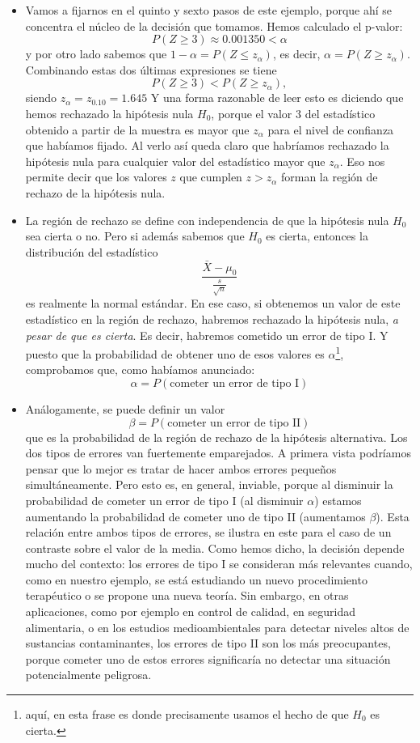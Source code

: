 \begin{itemize}
     \item Vamos a fijarnos en el quinto y sexto pasos de este ejemplo, porque ahí se concentra el núcleo de la decisión que tomamos. Hemos calculado el p-valor:
          \[P(Z\geq 3)\approx 0.001350<\alpha\]
          y por otro lado sabemos que $1-\alpha=P(Z\leq z_{\alpha})$, es decir, $\alpha=P(Z\geq z_{\alpha})$. Combinando estas dos últimas expresiones se tiene
          \[P(Z\geq 3)<P(Z\geq z_{\alpha}),\]
          siendo $z_{\alpha}=z_{0.10}=1.645$
          Y una forma razonable de leer esto es diciendo que hemos rechazado la hipótesis nula $H_0$, porque el valor $3$ del estadístico obtenido a partir de la muestra es mayor que $z_{\alpha}$ para el nivel de confianza que habíamos fijado. Al verlo así queda claro que habríamos rechazado la hipótesis nula para cualquier valor del estadístico mayor que $z_{\alpha}$. Eso nos permite decir que los valores $z$ que cumplen $z>z_{\alpha}$ forman la {\sf región de rechazo} de la hipótesis nula.

     \item La región de rechazo se define con independencia de que la hipótesis nula $H_0$ sea cierta o no. Pero si además sabemos que $H_0$ es cierta, entonces la distribución del estadístico
     \[\dfrac{\bar X-\mu_0}{\frac{s}{\sqrt{n}}}\]
     es realmente la normal estándar. En ese caso, si obtenemos un valor de este estadístico en la región de rechazo, habremos rechazado la hipótesis nula, {\em a pesar de que es cierta}. Es decir, habremos cometido un error de tipo I. Y puesto que la probabilidad de obtener uno de esos valores es $\alpha$\footnote{aquí, en esta frase es donde precisamente usamos el hecho de que $H_0$ es cierta.}, comprobamos que, como habíamos anunciado:
     \[\alpha=P(\mbox{cometer un error de tipo I})\]

     \item Análogamente, se puede definir un valor
     \[\beta=P(\mbox{cometer un error de tipo II})\]
     que es la probabilidad de la región de rechazo de la hipótesis alternativa. Los dos tipos de errores van fuertemente emparejados. A primera vista podríamos pensar que lo mejor es tratar de hacer ambos errores pequeños simultáneamente. Pero esto es, en general, inviable, porque al disminuir la probabilidad de cometer un error de tipo I (al disminuir $\alpha$) estamos aumentando la probabilidad de cometer uno de tipo II (aumentamos $\beta$). Esta relación entre ambos tipos de errores, se ilustra en este  para el caso de un contraste sobre el valor de la media. Como hemos dicho, la decisión depende mucho del contexto: los errores de tipo I se consideran más relevantes cuando, como en nuestro ejemplo, se está estudiando un nuevo procedimiento terapéutico o se propone una nueva teoría. Sin embargo, en otras aplicaciones, como por ejemplo en control de calidad, en seguridad alimentaria, o en los estudios medioambientales para detectar niveles altos de sustancias contaminantes, los errores de tipo II son los más preocupantes, porque cometer uno de estos errores significaría no detectar una situación potencialmente peligrosa.
    \end{itemize}

